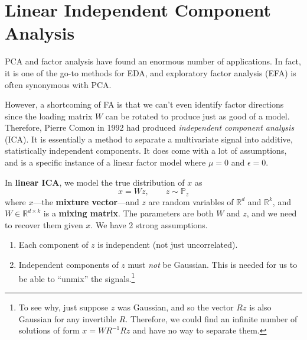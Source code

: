\section{Linear Independent Component Analysis} 

  PCA and factor analysis have found an enormous number of applications. In fact, it is one of the go-to methods for EDA, and exploratory factor analysis (EFA) is often synonymous with PCA. 

  However, a shortcoming of FA is that we can't even identify factor directions since the loading matrix $W$ can be rotated to produce just as good of a model. Therefore, Pierre Comon in 1992 had produced \textit{independent component analysis} (ICA). It is essentially a method to separate a multivariate signal into additive, statistically independent components. It does come with a lot of assumptions, and is a specific instance of a linear factor model where $\mu = 0$ and $\epsilon = 0$. 

  \begin{definition}
    In \textbf{linear ICA}, we model the true distribution of $x$ as 
    \begin{equation}
      x = W z, \qquad z \sim \mathbb{P}_z
    \end{equation}
    where $x$---the \textbf{mixture vector}---and $z$ are random variables of $\mathbb{R}^d$ and $\mathbb{R}^k$, and $W \in \mathbb{R}^{d \times k}$ is a \textbf{mixing matrix}. The parameters are both $W$ and $z$, and we need to recover them given $x$. We have 2 strong assumptions. 
    \begin{enumerate} 
      \item Each component of $z$ is independent (not just uncorrelated). 
      \item Independent components of $z$ must \textit{not} be Gaussian. This is needed for us to be able to ``unmix'' the signals.\footnote{ To see why, just suppose $z$ was Gaussian, and so the vector $Rz$ is also Gaussian for any invertible $R$. Therefore, we could find an infinite number of solutions of form $x = W R^{-1} R z$ and have no way to separate them.}
    \end{enumerate}
  \end{definition}

